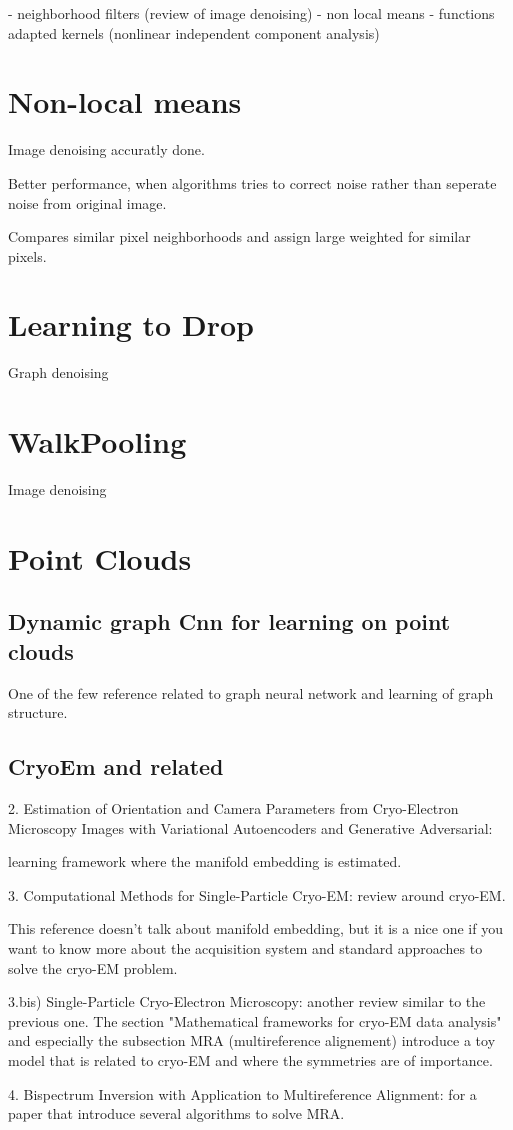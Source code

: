 - neighborhood filters (review of image denoising)
- non local means
- functions adapted kernels (nonlinear independent component analysis)


\section{Non-local means}
Image denoising accuratly done.

Better performance, when algorithms tries to correct noise rather than seperate noise
from original image.

Compares similar pixel neighborhoods and assign large weighted for similar pixels.




\section{Learning to Drop}
Graph denoising


\section{WalkPooling}
Image denoising

\section{Point Clouds}
\subsection{Dynamic graph Cnn for learning on point clouds}
One of the few reference related to graph neural network and learning of graph structure. 


\subsection{CryoEm and related}
2. Estimation of Orientation and Camera Parameters from Cryo-Electron Microscopy Images with Variational Autoencoders and Generative Adversarial: 

learning framework where the manifold embedding is estimated.

3. Computational Methods for Single-Particle Cryo-EM: 
review around cryo-EM. 

This reference doesn't talk about manifold embedding, but it is a nice one if you want to know more about 
the acquisition system and standard approaches to solve the cryo-EM problem.


3.bis) Single-Particle Cryo-Electron Microscopy: 
another review similar to the previous one. The section "Mathematical frameworks for cryo-EM data analysis" 
and especially the subsection MRA (multireference alignement) introduce 
a toy model that is related to cryo-EM and where the symmetries are of importance. 

4. Bispectrum Inversion with Application to Multireference Alignment: 
for a paper that introduce several algorithms to solve MRA.